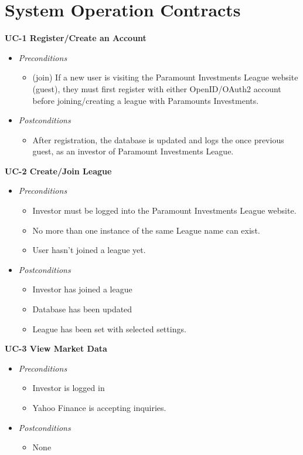 \section{System Operation Contracts}



\textbf{UC-1 Register/Create an Account}
\begin{itemize}
	\item \emph{Preconditions}
		\begin{itemize}
		\item (join) If a new user is visiting the Paramount Investments League website (guest), they must first register with either OpenID/OAuth2 account before joining/creating a league with Paramounts Investments.
        \end{itemize}
	\item \emph{Postconditions}
		\begin{itemize}
		\item After registration, the database is updated and logs the once previous guest, as an investor of Paramount Investments League.		
        \end{itemize}
\end{itemize}

\textbf{UC-2 Create/Join League}
\begin{itemize}
	\item \emph{Preconditions}
		\begin{itemize}
\item Investor must be logged into the Paramount Investments League website.
\item No more than one instance of the same League name can exist.
\item User hasn’t joined a league yet.
				\end{itemize}
	\item \emph{Postconditions}
		\begin{itemize}
\item Investor has joined a league
\item Database has been updated
\item League has been set with selected settings.
			\end{itemize}
\end{itemize}

\textbf{UC-3 View Market Data}
\begin{itemize}
	\item \emph{Preconditions}
		\begin{itemize}
\item Investor is logged in
\item Yahoo Finance is accepting inquiries.
			\end{itemize}
	\item \emph{Postconditions}
		\begin{itemize}
		\item None
		\end{itemize}
\end{itemize}

